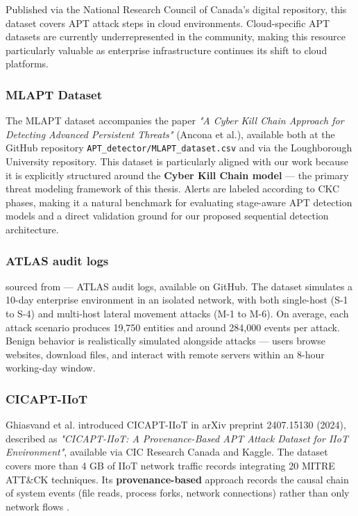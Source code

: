 Published via the National Research Council of Canada's digital repository, this dataset covers APT attack steps in cloud environments. Cloud-specific APT datasets are currently underrepresented in the community, making this resource particularly valuable as enterprise infrastructure continues its shift to cloud platforms.

\subsubsection{MLAPT Dataset}

The MLAPT dataset accompanies the paper \textit{"A Cyber Kill Chain Approach for Detecting Advanced Persistent Threats"} (Ancona et al.), available both at the GitHub repository \texttt{APT\_detector/MLAPT\_dataset.csv} and via the Loughborough University repository. This dataset is particularly aligned with our work because it is explicitly structured around the \textbf{Cyber Kill Chain model} --- the primary threat modeling framework of this thesis. Alerts are labeled according to CKC phases, making it a natural benchmark for evaluating stage-aware APT detection models and a direct validation ground for our proposed sequential detection architecture.

\subsubsection{ATLAS audit logs}

sourced from \cite{alsaheel2021atlas} — ATLAS audit logs, available on GitHub. The dataset simulates a 10-day enterprise environment in an isolated network, with both single-host (S-1 to S-4) and multi-host lateral movement attacks (M-1 to M-6). On average, each attack scenario produces 19,750 entities and around 284,000 events per attack. Benign behavior is realistically simulated alongside attacks — users browse websites, download files, and interact with remote servers within an 8-hour working-day window.

\subsubsection{CICAPT-IIoT}

Ghiasvand et al. \cite{ghiasvand2024cicapt} introduced CICAPT-IIoT in arXiv preprint 2407.15130 (2024), described as \textit{"CICAPT-IIoT: A Provenance-Based APT Attack Dataset for IIoT Environment"}, available via CIC Research Canada and Kaggle. The dataset covers more than 4 GB of IIoT network traffic records integrating 20 MITRE ATT\&CK techniques. Its \textbf{provenance-based} approach records the causal chain of system events (file reads, process forks, network connections) rather than only network flows .

